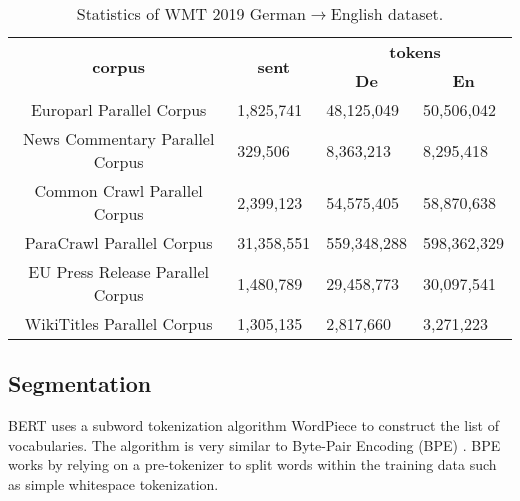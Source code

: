 \begin{table}[h]
    \centering
    \begin{tabular}{@{}clll@{}}
        \toprule
        \multirow{2}{*}{\textbf{corpus}} & \multicolumn{1}{c}{\multirow{2}{*}{\textbf{sent}}} & \multicolumn{2}{c}{\textbf{tokens}}                                   \\
                                         & \multicolumn{1}{c}{}                               & \multicolumn{1}{c}{\textbf{De}}     & \multicolumn{1}{c}{\textbf{En}} \\ \midrule
        Europarl Parallel Corpus         & 1,825,741                                          & 48,125,049                          & 50,506,042                      \\
        News Commentary Parallel Corpus  & 329,506                                            & 8,363,213                           & 8,295,418                       \\
        Common Crawl Parallel Corpus     & 2,399,123                                          & 54,575,405                          & 58,870,638                      \\
        ParaCrawl Parallel Corpus        & 31,358,551                                         & 559,348,288                         & 598,362,329                     \\
        EU Press Release Parallel Corpus & 1,480,789                                          & 29,458,773                          & 30,097,541                      \\
        WikiTitles Parallel Corpus       & 1,305,135                                          & 2,817,660                           & 3,271,223                       \\ \bottomrule
    \end{tabular}
    \caption{Statistics of WMT 2019 German$\rightarrow$English dataset.}
    \label{tab:wmt19stat}
\end{table}

\subsection{Segmentation}
BERT uses a subword tokenization algorithm WordPiece \cite{schuster2012japanese} to construct the list of vocabularies. The algorithm is very similar to Byte-Pair Encoding (BPE) \cite{sennrich-etal-2016-neural}. BPE works by relying on a pre-tokenizer to split words within the training data such as simple whitespace tokenization.

